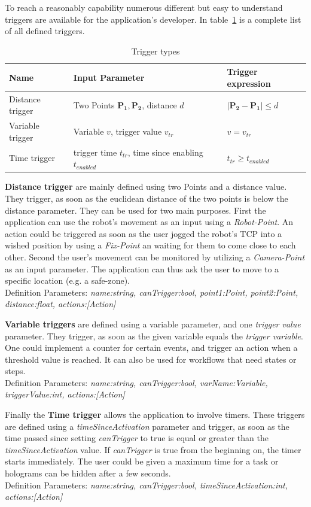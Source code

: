 To reach a reasonably capability numerous different but easy to understand triggers are available for the application's developer. In table~\ref{Table:Triggers} is a complete list of all defined triggers.

 
 \begin{table}
 	\caption{Trigger types}
 	\label{Table:Triggers}
 	\centering
 	\begin{tabular}{lll}
 		\toprule
 		Name & Input Parameter		& Trigger expression	\\		
 		\midrule
 		Distance trigger & Two Points $\boldsymbol{P_1}, \boldsymbol{P_2}$, distance $d$		&  $|\boldsymbol{P_2}-\boldsymbol{P_1}| \le d$ \\
		Variable trigger & Variable $v$, trigger value $v_{tr}$ 		& $v = v_{tr}$	 \\
		Time trigger & trigger time $t_{tr}$, time since enabling $t_{enabled}$ & $t_{tr} \geq t_{enabled}$\\
		\bottomrule
	\end{tabular}
\end{table}

\textbf{Distance trigger} are mainly defined using two Points and a distance value. They trigger, as soon as the euclidean distance of the two points is below the distance parameter. They can be used for two main purposes. First the application can use the robot's movement as an input using a \textit{Robot-Point}. An action could be triggered as soon as the user jogged the robot's TCP into a wished position by using a \textit{Fix-Point} an waiting for them to come close to each other. Second the user's movement can be monitored by utilizing a \textit{Camera-Point} as an input parameter. The application can thus ask the user to move to a specific location (e.g. a safe-zone).\\Definition Parameters: \textit{name:string, canTrigger:bool, point1:Point, point2:Point, distance:float, actions:[Action] }

\textbf{Variable triggers} are defined using a variable parameter, and one \textit{trigger value} parameter. They trigger, as soon as the given variable equals the \textit{trigger variable}. One could implement a counter for certain events, and trigger an action when a threshold value is reached. It can also be used for workflows that need states or steps. \\Definition Parameters: \textit{name:string, canTrigger:bool, varName:Variable, triggerValue:int, actions:[Action]}

Finally the \textbf{Time trigger} allows the application to involve timers. These triggers are defined using a \textit{timeSinceActivation} parameter and trigger, as soon as the time passed since setting \textit{canTrigger} to true is equal or greater than the \textit{timeSinceActivation} value. If \textit{canTrigger} is true from the beginning on, the timer starts immediately. The user could be given a maximum time for a task or holograms can be hidden after a few seconds.\\Definition Parameters: \textit{name:string, canTrigger:bool, timeSinceActivation:int, actions:[Action]}

